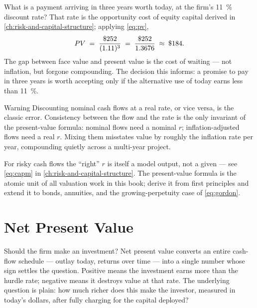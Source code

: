 \begin{example}
What is a  payment arriving in three years worth today, at the firm's
\qty{11}{\percent} discount rate? That rate is the opportunity cost of equity capital derived
in \cref{ch:risk-and-capital-structure}; applying \cref{eq:pv},
\[
  PV \;=\; \frac{\$\num{252}}{(1.11)^{3}}
      \;=\; \frac{\$\num{252}}{1.3676}
      \;\approx\; \$\num{184}.
\]
The  gap between face value and present value is the cost of waiting --- not
inflation, but forgone compounding. The decision this informs: a promise to pay 
in three years is worth accepting only if the alternative use of  today earns less
than \qty{11}{\percent}.
\end{example}

\begin{admonition}{Warning}
Discounting nominal cash flows at a real rate, or vice versa, is the classic error.
Consistency between the flow and the rate is the only invariant of the present-value formula:
nominal flows need a nominal \(r\); inflation-adjusted flows need a real \(r\). Mixing them
misstates value by roughly the inflation rate per year, compounding quietly across a
multi-year project.
\end{admonition}

For risky cash flows the ``right'' \(r\) is itself a model output, not a given --- see
\cref{eq:capm} in \cref{ch:risk-and-capital-structure}. The present-value formula is the
atomic unit of all valuation work in this book; \textcite{brealey2020} derive it from first
principles and extend it to bonds, annuities, and the growing-perpetuity case of
\cref{eq:gordon}.

\section{Net Present Value}\label{sec:net-present-value}

Should the firm make an investment? Net present value converts an entire cash-flow schedule
--- outlay today, returns over time --- into a single number whose sign settles the question.
Positive means the investment earns more than the hurdle rate; negative means it destroys
value at that rate. The underlying question is plain: how much richer does this make the
investor, measured in today's dollars, after fully charging for the capital deployed?

